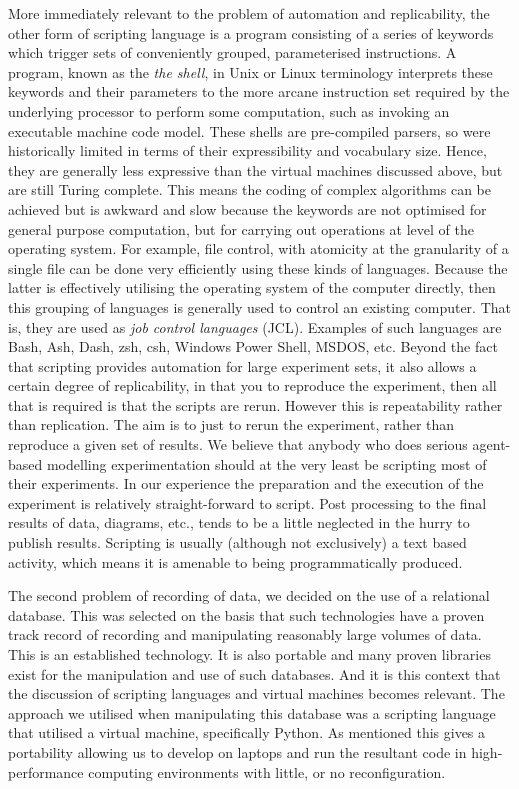\documentclass[runningheads]{llncs}
\begin{document}
More immediately relevant to the problem of automation and replicability, the
other form of scripting language is a program consisting of a series of
keywords which trigger sets of conveniently grouped, parameterised
instructions. A program, known as the \emph{the shell}, in Unix or Linux
terminology interprets these keywords and their parameters to the more arcane
instruction set required by the underlying processor to perform some
computation, such as invoking an executable machine code model. These shells
are pre-compiled parsers, so were historically limited in terms of their
expressibility and vocabulary size. Hence, they are generally less expressive
than the virtual machines discussed above, but are still Turing complete. This
means the coding of complex algorithms can be achieved but is awkward and slow
because the keywords are not optimised for general purpose computation, but for
carrying out operations at level of the operating system. For example, file
control, with atomicity at the granularity of a single file can be done very
efficiently using these kinds of languages. Because the latter is effectively
utilising the operating system of the computer directly, then this grouping of
languages is generally used to control an existing computer. That is, they are
used as \emph{job control languages} (JCL). Examples of such languages are
Bash, Ash, Dash, zsh, csh, Windows Power Shell, MSDOS, etc. Beyond the fact
that scripting provides automation for large experiment sets, it also allows a
certain degree of replicability, in that you to reproduce the experiment, then
all that is required is that the scripts are rerun. However this is
repeatability rather than replication. The aim is to just to rerun the
experiment, rather than reproduce a given set of results.  We believe that
anybody who does serious agent-based modelling experimentation should at the
very least be scripting most of their experiments. In our experience the
preparation and the execution of the experiment is relatively straight-forward
to script. Post processing to the final results of data, diagrams, etc., tends
to be a little neglected in the hurry to publish results.  Scripting is usually
(although not exclusively) a text based activity, which means it is amenable to
being programmatically produced. 

The second problem of recording of data, we decided on the use of a relational
database. This was selected on the basis that such technologies have a proven
track record of recording and manipulating reasonably large volumes of data.
This is an established technology. It is also portable and many proven
libraries exist for the manipulation and use of such databases. And it is this
context that the discussion of scripting languages and virtual machines becomes
relevant. The approach we utilised when manipulating this database was a
scripting language that utilised a virtual machine, specifically Python. As
mentioned this gives a portability allowing us to develop on laptops and run
the resultant code in high-performance computing environments with little, or
no reconfiguration. 
\end{document}
